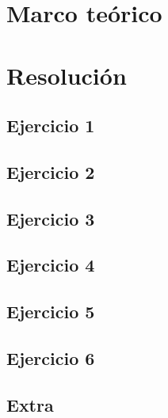 \documentclass{estilo}
\begin{document}
\section*{Marco teórico}

\newpage
\section*{Resolución}
\hypertarget{ej1}{\subsection*{Ejercicio 1}}

\hypertarget{ej2}{\subsection*{Ejercicio 2}}

\hypertarget{ej3}{\subsection*{Ejercicio 3}}

\hypertarget{ej4}{\subsection*{Ejercicio 4}}

\hypertarget{ej5}{\subsection*{Ejercicio 5}}

\hypertarget{ej6}{\subsection*{Ejercicio 6}}

\newpage
\subsection*{Extra}\label{extra}

\end{document}
